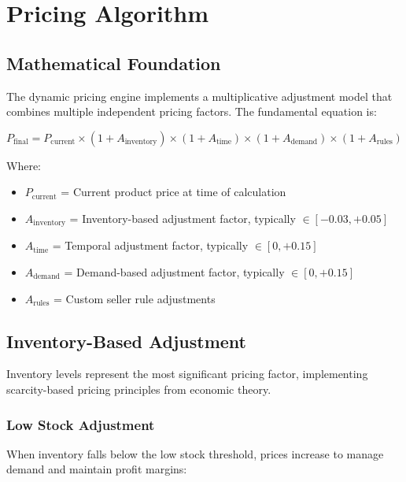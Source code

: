 \documentclass[12pt,a4paper,oneside]{report}
\begin{document}
\newpage

\chapter{Pricing Algorithm}

\section{Mathematical Foundation}

The dynamic pricing engine implements a multiplicative adjustment model that combines multiple independent pricing factors. The fundamental equation is:

\begin{equation}
P_{\text{final}} = P_{\text{current}} \times (1 + A_{\text{inventory}}) \times (1 + A_{\text{time}}) \times (1 + A_{\text{demand}}) \times (1 + A_{\text{rules}})
\end{equation}

Where:
\begin{itemize}
    \item $P_{\text{current}}$ = Current product price at time of calculation
    \item $A_{\text{inventory}}$ = Inventory-based adjustment factor, typically $\in [-0.03, +0.05]$
    \item $A_{\text{time}}$ = Temporal adjustment factor, typically $\in [0, +0.15]$
    \item $A_{\text{demand}}$ = Demand-based adjustment factor, typically $\in [0, +0.15]$
    \item $A_{\text{rules}}$ = Custom seller rule adjustments
\end{itemize}

\section{Inventory-Based Adjustment}

Inventory levels represent the most significant pricing factor, implementing scarcity-based pricing principles from economic theory.

\subsection{Low Stock Adjustment}

When inventory falls below the low stock threshold, prices increase to manage demand and maintain profit margins:
\end{document}

